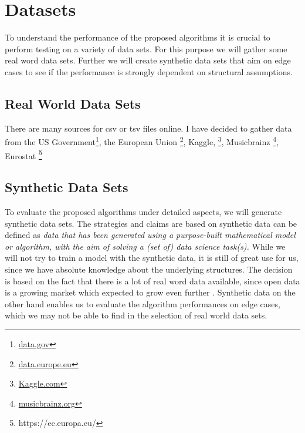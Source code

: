 \chapter{Datasets}
To understand the performance of the proposed algorithms it is crucial to perform testing on a variety of data sets. For this purpose we will gather some real word data sets. Further we will create synthetic data sets that aim on edge cases to see if the performance is strongly dependent on structural assumptions.

\section{Real World Data Sets}
There are many sources for csv or tsv files online. I have decided to gather data from the US Government\footnote{\href{https://data.gov}{data.gov}}, the European Union \footnote{\href{https://data.europe.eu}{data.europe.eu}}, Kaggle, \footnote{\href{https://kaggle.com}{Kaggle.com}}, Musicbrainz \footnote{\href{https://musicbrainz.org/}{musicbrainz.org}}, Eurostat \footnote{https://ec.europa.eu/} 


\section{Synthetic Data Sets}
To evaluate the proposed algorithms under detailed aspects, we will generate synthetic data sets. The strategies and claims are based on \cite{jordon2022synthetic} synthetic data can be defined as \textit{data that has been generated using a purpose-built mathematical model or algorithm, with the aim of solving a (set of) data science task(s).} While we will not try to train a model with the synthetic data, it is still of great use for us, since we have absolute knowledge about the underlying structures. The decision is based on the fact that there is a lot of real word data available, since open data is a growing market which expected to grow even further \cite{EUopenData}. Synthetic data on the other hand enables us to evaluate the algorithm performances on edge cases, which we may not be able to find in the selection of real world data sets. \\

